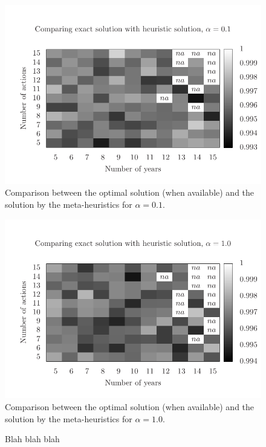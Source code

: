 \begin{figure}
\centering
\includegraphics[scale=0.73, trim=1cm 0 0 0]{figs/comp_hard.pdf}
\caption{Comparison between the optimal solution (when available) 
and the solution by the meta-heuristics for $\alpha=0.1$.}
\label{fig:mh1_2}
\end{figure}

\begin{figure}
\centering
\includegraphics[scale=0.73, trim=1cm 0 0 0]{figs/comp_easy.pdf}
\caption{Comparison between the optimal solution (when available) 
and the solution by the meta-heuristics for $\alpha=1.0$.}
\label{fig:mh1_3}
\end{figure}

\begin{figure}
\centering
\missingfigure[figwidth=8cm]{}
\caption{Blah blah blah}
\label{fig:mh2_1}
\end{figure}

